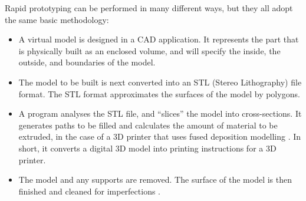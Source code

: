 Rapid prototyping can be performed in many different ways, but they all adopt the same basic methodology:

\begin{itemize} \itemsep0em
  \item A virtual model is designed in a CAD application.  It represents the part that is physically built as an enclosed volume, and will specify the inside, the outside, and boundaries of the model.
  \item The model to be built is next converted into an STL (Stereo Lithography) file format. The STL format approximates the surfaces of the model by polygons.
  \item A program analyses the STL file, and ``slices'' the model into cross-sections. It generates paths to be filled and calculates the amount of material to be extruded, in the case of a 3D printer that uses fused deposition modelling \cite{slic3r}. In short, it converts a digital 3D model into printing instructions for a 3D printer.
  \item The model and any supports are removed. The surface of the model is then finished and cleaned for imperfections \cite{efunda}.
\end{itemize}
